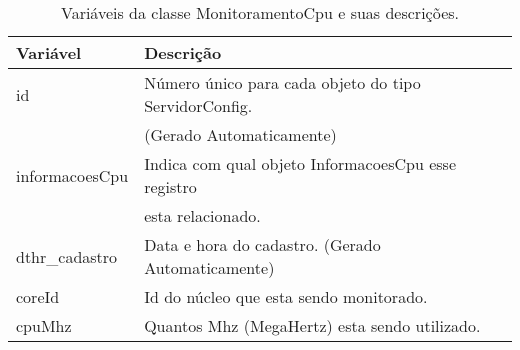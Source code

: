 \begin{table}[!ht]
\centering
\begin{tabular}{|l|l|}
\hline
{\color[HTML]{000000} \textbf{Variável}} & {\color[HTML]{000000} \textbf{Descrição}}                                      \\ \hline
id                                       & Número único para cada objeto do tipo ServidorConfig.\\ 
																				 &(Gerado Automaticamente) 																												\\ \hline
informacoesCpu                           & Indica com qual objeto InformacoesCpu esse registro \\ 
																				 &esta relacionado.          \\ \hline
dthr\_cadastro                           & Data e hora do cadastro. (Gerado Automaticamente)                              \\ \hline
coreId                                   & Id do núcleo que esta sendo monitorado.                                        \\ \hline
cpuMhz                                   & Quantos Mhz (MegaHertz) esta sendo utilizado.                                  \\ \hline
\end{tabular}
\caption[Variáveis da classe MonitoramentoCpu e suas descrições.]{Variáveis da classe MonitoramentoCpu e suas descrições.}
\label{Tab:VariaveisMonitoramentoCpu}
\end{table}

